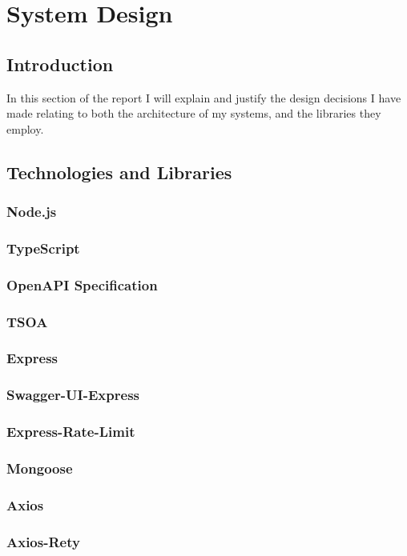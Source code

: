 \chapter{System Design}
\section{Introduction}
In this section of the report I will explain and justify the design decisions I have made relating to both the architecture of my systems, and the libraries they employ.
\section{Technologies and Libraries}
    \subsection{Node.js}
    \subsection{TypeScript}
    \subsection{OpenAPI Specification}
    \subsection{TSOA}
    \subsection{Express}
    \subsection{Swagger-UI-Express}
    \subsection{Express-Rate-Limit}
    \subsection{Mongoose}
    \subsection{Axios}
    \subsection{Axios-Rety}
